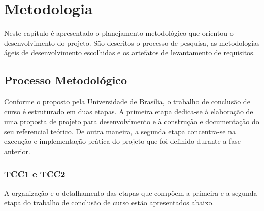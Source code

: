 \chapter{Metodologia}

Neste capítulo é apresentado o planejamento metodológico que orientou o desenvolvimento do projeto.
São descritos o processo de pesquisa, as metodologias ágeis de desenvolvimento escolhidas e os artefatos de levantamento de requisitos.

\section{Processo Metodológico}

Conforme o proposto pela Universidade de Brasília, o trabalho de conclusão de curso é estruturado em duas etapas.
A primeira etapa dedica-se à elaboração de uma proposta de projeto para desenvolvimento e à construção e documentação do seu referencial teórico.
De outra maneira, a segunda etapa concentra-se na execução e implementação prática do projeto que foi definido durante a fase anterior.

\subsection{TCC1 e TCC2}

A organização e o detalhamento das etapas que compõem a primeira e a segunda etapa do trabalho de conclusão de curso estão apresentados abaixo.

